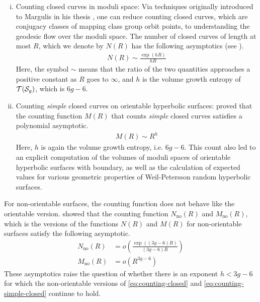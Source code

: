 \begin{enumerate}[(i)]
\item Counting closed curves in moduli space: Via techniques originally introduced to Margulis in his thesis \cite{margulis2004some}, one can reduce counting closed curves, which are conjugacy classes of mapping class group orbit points, to understanding the geodesic flow over the moduli space.
  The number of closed curves of length at most $R$, which we denote by $N(R)$ has the following asymptotics (see \cite{eskinmirzakhani}).
  \begin{align}
    \label{eq:counting-closed}
    N(R) \sim \frac{\exp(hR)}{hR}
  \end{align}
  Here, the symbol $\sim$ means that the ratio of the two quantities approaches a positive constant as $R$ goes to $\infty$, and $h$ is the volume growth entropy of $\mathcal{T}(\mathcal{S}_{g})$, which is $6g-6$.
\item Counting \emph{simple} closed curves on orientable hyperbolic surfaces: \textcite{mirzakhani2008growth} proved that the counting function $M(R)$ that counts \emph{simple} closed curves satisfies a polynomial asymptotic.
  \begin{align}
    \label{eq:counting-simple-closed}
    M(R) \sim R^{h}
  \end{align}
  Here, $h$ is again the volume growth entropy, i.e. $6g-6$.
  This count also led to an explicit computation of the volumes of moduli spaces of orientable hyperbolic surfaces with boundary, as well as the calculation of expected values for various geometric properties of Weil-Petersson random hyperbolic surfaces.
\end{enumerate}

For non-orientable surfaces, the counting function does not behave like the orientable version.
\textcite{gendulphe2017whats} showed that the counting function $N_{\mathrm{no}}(R)$ and $M_{\mathrm{no}}(R)$, which is the versions of the functions $N(R)$ and $M(R)$ for non-orientable surfaces satisfy the following asymptotic.
\begin{align*}
  N_{\mathrm{no}}(R) &= o\left( \frac{\exp((3g-6)R)}{(3g-6)R} \right) \\
  M_{\mathrm{no}}(R) &= o(R^{3g-6})
\end{align*}
These asymptotics raise the question of whether there is an exponent $h < 3g-6$ for which the non-orientable versions of \eqref{eq:counting-closed} and \eqref{eq:counting-simple-closed} continue to hold.

